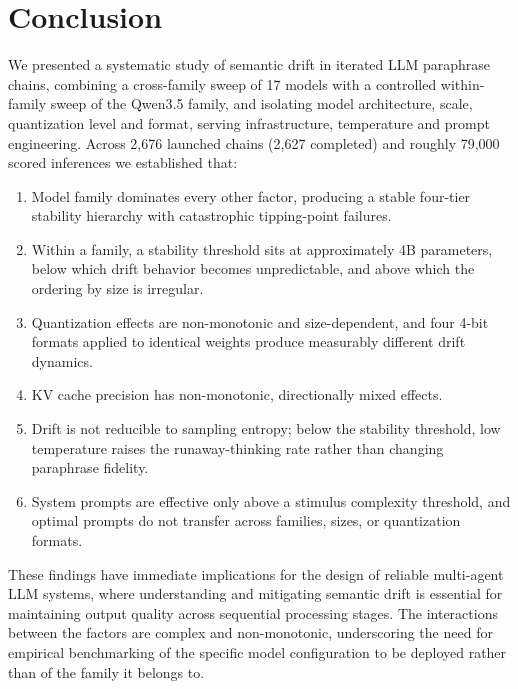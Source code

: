 \documentclass[11pt]{article}
\begin{document}
\section{Conclusion}
\label{sec:conclusion}

We presented a systematic study of semantic drift in iterated LLM paraphrase
chains, combining a cross-family sweep of 17 models with a controlled
within-family sweep of the Qwen3.5 family, and isolating model architecture,
scale, quantization level and format, serving infrastructure, temperature and
prompt engineering. Across 2{,}676 launched chains (2{,}627 completed) and roughly 79{,}000 scored
inferences we established that:

\begin{enumerate}[leftmargin=*]
  \item Model family dominates every other factor, producing a stable four-tier
        stability hierarchy with catastrophic tipping-point failures.
  \item Within a family, a stability threshold sits at approximately 4B
        parameters, below which drift behavior becomes unpredictable, and above
        which the ordering by size is irregular.
  \item Quantization effects are non-monotonic and size-dependent, and four
        4-bit formats applied to identical weights produce measurably different
        drift dynamics.
  \item KV cache precision has non-monotonic, directionally mixed effects.
  \item Drift is not reducible to sampling entropy; below the stability
        threshold, low temperature raises the runaway-thinking rate rather
        than changing paraphrase fidelity.
  \item System prompts are effective only above a stimulus complexity
        threshold, and optimal prompts do not transfer across families, sizes,
        or quantization formats.
\end{enumerate}

These findings have immediate implications for the design of reliable multi-agent
LLM systems, where understanding and mitigating semantic drift is essential for
maintaining output quality across sequential processing stages. The interactions
between the factors are complex and non-monotonic, underscoring the need for
empirical benchmarking of the specific model configuration to be deployed rather
than of the family it belongs to.
\end{document}
